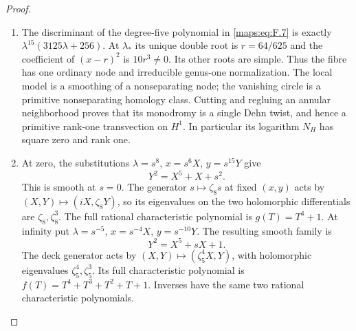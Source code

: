 \documentclass[11pt,a4paper]{article}
\theoremstyle{definition}
\begin{document}
\begin{proof}
\begin{enumerate}[label=\arabic*.]
\item The discriminant of the degree-five polynomial in \eqref{maps:eq:F.7} is exactly
$\lambda^{15}(3125\lambda+256)$.  At $\lambda_*$ its unique double
root is $r=64/625$ and the coefficient of $(x-r)^2$ is
$10r^3\ne0$.  Its other roots are simple.  Thus the fibre has one
ordinary node and irreducible genus-one normalization.  The local
model is a smoothing of a nonseparating node; the vanishing circle
is a primitive nonseparating homology class.  Cutting and regluing
an annular neighborhood proves that its monodromy is a single
Dehn twist, and hence a primitive rank-one transvection on $H^1$.
In particular its logarithm $N_H$ has square zero and rank one.

\item At zero, the substitutions $\lambda=s^8$, $x=s^6X$, $y=s^{15}Y$
give
\[
 Y^2=X^5+X+s^2.
\]
This is smooth at $s=0$.  The generator $s\mapsto\zeta_8s$ at
fixed $(x,y)$ acts by $(X,Y)\mapsto(iX,\zeta_8Y)$, so its
eigenvalues on the two holomorphic differentials are
$\zeta_8,\zeta_8^3$.  The full rational characteristic polynomial
is $g(T)=T^4+1$.
At infinity put $\lambda=s^{-5}$, $x=s^{-4}X$, $y=s^{-10}Y$.
The resulting smooth family is
\[
 Y^2=X^5+sX+1.
\]
The deck generator acts by $(X,Y)\mapsto(\zeta_5^4X,Y)$,
with holomorphic eigenvalues $\zeta_5^4,\zeta_5^3$.  Its full
characteristic polynomial is $f(T)=T^4+T^3+T^2+T+1$.
Inverses have the same two rational characteristic polynomials.


\end{enumerate}
\end{proof}
\end{document}

